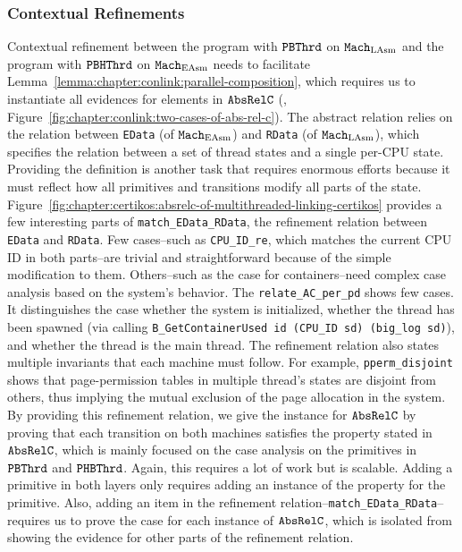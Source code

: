 \subsubsection{Contextual Refinements}
Contextual refinement between the program with ${{\mathrm{\texttt{PBThrd}}}}$ on ${\mathrm{\texttt{Mach}}}_{\mathrm{LAsm}}$ and 
 the program with ${\mathrm{\texttt{PBHThrd}}}$ on ${\mathrm{\texttt{Mach}}}_{\mathrm{EAsm}}$
 needs to facilitate Lemma~\ref{lemma:chapter:conlink:parallel-composition}, 
 which requires us to instantiate all evidences for elements in ${{\mathrm{\texttt{AbsRelC}}}}$ (\eg, 
 Figure~\ref{fig:chapter:conlink:two-cases-of-abs-rel-c}).
The abstract relation relies on the relation between  \lstinline$EData$ (of ${\mathrm{\texttt{Mach}}}_{\mathrm{EAsm}}$) and \lstinline$RData$ (of ${\mathrm{\texttt{Mach}}}_{\mathrm{LAsm}}$),
which specifies the relation between a set of thread states and a single per-CPU state. 
Providing the definition is another task that requires enormous efforts 
because it must reflect how
all primitives and transitions modify all parts of the state.
Figure~\ref{fig:chapter:certikos:absrelc-of-multithreaded-linking-certikos} provides
a few interesting parts of  \lstinline$match_EData_RData$, the refinement relation between \lstinline$EData$ and  \lstinline$RData$.
Few cases--such as \lstinline$CPU_ID_re$, which matches the current CPU ID in both parts--are trivial and straightforward because of the simple modification to them. 
Others--such as the case for containers--need complex case analysis based on the system's behavior. 
The \lstinline$relate_AC_per_pd$ shows few cases.
It distinguishes the case whether the system is initialized, whether the thread has been
spawned (via calling \lstinline$B_GetContainerUsed id (CPU_ID sd) (big_log sd)$),
and whether the thread is the main thread.
The refinement relation also states multiple invariants
that each machine must follow.
For example, \lstinline$pperm_disjoint$ shows
that page-permission tables in multiple thread's states are disjoint from others, thus implying
the mutual exclusion of the page allocation in the system. 
By providing this refinement relation,
we give the instance for ${{\mathrm{\texttt{AbsRelC}}}}$ by proving 
that each transition on both machines satisfies the property stated in ${{\mathrm{\texttt{AbsRelC}}}}$,
which is mainly focused on the case analysis on the primitives in  ${{\mathrm{\texttt{PBThrd}}}}$ and ${{\mathrm{\texttt{PHBThrd}}}}$.
Again, this requires a lot of work but is scalable.
Adding a primitive in both layers only requires adding an instance of the property for the primitive.
Also, adding an item in the refinement relation--\lstinline$match_EData_RData$--requires 
us to prove the case for each instance of ${{\mathrm{\texttt{AbsRelC}}}}$,
which is isolated from showing the evidence for other parts of the refinement relation.

